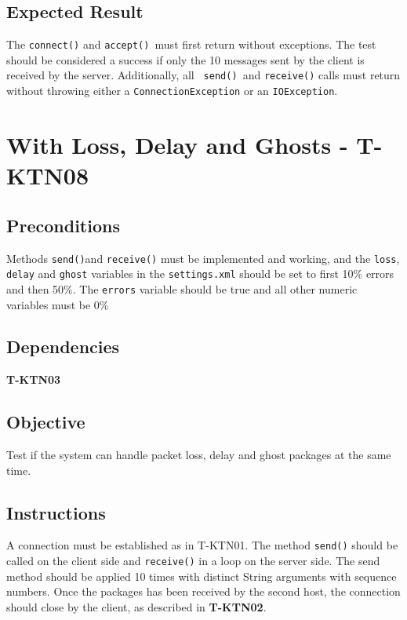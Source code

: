 \documentclass{article}
\begin{document}
\subsection{Expected Result}

The \texttt{connect()} and \texttt{accept() }must first return without
exceptions. The test should be considered a success if only the 10 messages
sent by the client is received by the server. Additionally, all \texttt{%
send() }and \texttt{receive()} calls must return without throwing either a 
\texttt{ConnectionException} or an \texttt{IOException}.

\section{With Loss, Delay and Ghosts - T-KTN08}

\subsection{Preconditions}

Methods \texttt{send()}and \texttt{receive()} must be implemented and
working, and the \texttt{loss}, \texttt{delay} and \texttt{ghost} variables
in the \texttt{settings.xml} should be set to first 10\% errors and then
50\%. The \texttt{errors} variable should be true and all other numeric
variables must be 0\%

\subsection{Dependencies}

\textbf{T-KTN03}

\subsection{Objective}

Test if the system can handle packet loss, delay and ghost packages at the
same time.

\subsection{Instructions}

A connection must be established as in T-KTN01. The method \texttt{send()}
should be called on the client side and \texttt{receive()} in a loop on the
server side. The send method should be applied 10 times with distinct String
arguments with sequence numbers. Once the packages has been received by the
second host, the connection should close by the client, as described in 
\textbf{T-KTN02}.
\end{document}
